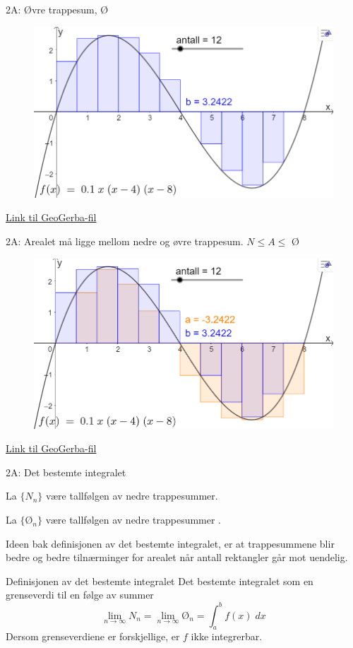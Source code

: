 \blueheader
\begin{frame}{2A: Øvre trappesum, Ø}
\begin{figure}
    \centering
    \includegraphics[width=0.7\linewidth]{R2-K2A-7.png}

\end{figure}

\href{https://www.geogebra.org/classic/rp6mbmm6}{Link til GeoGerba-fil}
\end{frame}

\blueheader
\begin{frame}{2A: Arealet må ligge mellom nedre og øvre trappesum. $N\leq A\leq$ Ø}
\begin{figure}
    \centering
    \includegraphics[width=0.7\linewidth]{R2-K2A-8.png}

\end{figure}

\href{https://www.geogebra.org/classic/rp6mbmm6}{Link til GeoGerba-fil}
\end{frame}

\blueheader
\begin{frame}{2A: Det bestemte integralet}

La  $\{N_n\}$ være tallfølgen av nedre trappesummer.

\medskip
La  $\{\text{Ø}_n\}$ være tallfølgen av nedre trappesummer  .

\medskip
Ideen bak definisjonen av det bestemte integralet, er at trappesummene blir bedre og bedre tilnærminger for arealet når antall rektangler går mot uendelig.

\begin{blue*}{Definisjonen av det bestemte integralet}
Det bestemte integralet som en grenseverdi til en følge av summer
\begin{equation*}
    \lim_{n\rightarrow \infty }N_ n =\lim_{n\rightarrow \infty }\text{Ø}_n=\int_a^bf(x)\;dx
\end{equation*}
Dersom grenseverdiene er forskjellige, er $f$ ikke integrerbar.
\end{blue*}
\end{frame}

